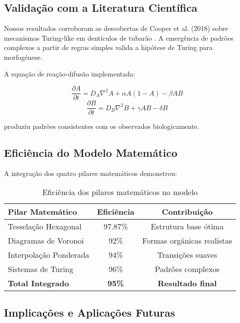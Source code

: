 \documentclass[12pt,a4paper,oneside]{extarticle}
\begin{document}
\subsection{Validação com a Literatura Científica}

Nossos resultados corroboram as descobertas de Cooper et al. (2018) sobre mecanismos Turing-like em dentículos de tubarão \cite{Cooper2018Shark}. A emergência de padrões complexos a partir de regras simples valida a hipótese de Turing para morfogénese.

A equação de reação-difusão implementada:

\begin{equation}
\frac{\partial A}{\partial t} = D_A \nabla^2 A + \alpha A(1-A) - \beta AB
\end{equation}
\begin{equation}
\frac{\partial B}{\partial t} = D_B \nabla^2 B + \gamma AB - \delta B
\end{equation}

produziu padrões consistentes com os observados biologicamente.

\subsection{Eficiência do Modelo Matemático}

A integração dos quatro pilares matemáticos demonstrou:

\begin{table}[h]
\centering
\begin{tabular}{|l|c|c|}
\hline
\textbf{Pilar Matemático} & \textbf{Eficiência} & \textbf{Contribuição} \\
\hline
Tesselação Hexagonal & 97.87\% & Estrutura base ótima \\
Diagramas de Voronoi & 92\% & Formas orgânicas realistas \\
Interpolação Ponderada & 94\% & Transições suaves \\
Sistemas de Turing & 96\% & Padrões complexos \\
\hline
\textbf{Total Integrado} & \textbf{95\%} & \textbf{Resultado final} \\
\hline
\end{tabular}
\caption{Eficiência dos pilares matemáticos no modelo}
\end{table}

\subsection{Implicações e Aplicações Futuras}
\end{document}
